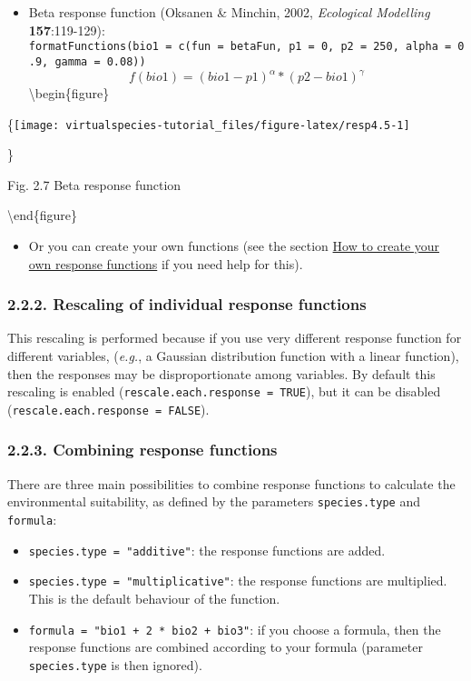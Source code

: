 \documentclass[]{article}
\providecommand{\tightlist}{%
  \setlength{\itemsep}{0pt}\setlength{\parskip}{0pt}}
\begin{document}
\begin{itemize}
\tightlist
\item
  Beta response function (Oksanen \& Minchin, 2002, \emph{Ecological
  Modelling} \textbf{157}:119-129):
  \texttt{formatFunctions(bio1\ =\ c(fun\ =\ \textquotesingle{}betaFun\textquotesingle{},\ p1\ =\ 0,\ p2\ =\ 250,\ alpha\ =\ 0.9,\ gamma\ =\ 0.08))}
  \[ f(bio1) = (bio1 - p1)^{\alpha} * (p2 - bio1)^{\gamma} \]
  \textbackslash{}begin\{figure\}
\end{itemize}

\{\centering \texttt{[image: virtualspecies-tutorial\_files/figure-latex/resp4.5-1]}

\}

\caption{Fig. 2.7 Beta response function}\label{fig:resp4.5}

\textbackslash{}end\{figure\}

\begin{itemize}
\tightlist
\item
  Or you can create your own functions (see the section
  \protect\hyperlink{how-to-create-and-use-your-own-response-functions}{How
  to create your own response functions} if you need help for this).
\end{itemize}

\subsubsection{2.2.2. Rescaling of individual response
functions}\label{rescaling-of-individual-response-functions}

This rescaling is performed because if you use very different response
function for different variables, (\emph{e.g.}, a Gaussian distribution
function with a linear function), then the responses may be
disproportionate among variables. By default this rescaling is enabled
(\texttt{rescale.each.response\ =\ TRUE}), but it can be disabled
(\texttt{rescale.each.response\ =\ FALSE}).

\subsubsection{2.2.3. Combining response
functions}\label{combining-response-functions}

There are three main possibilities to combine response functions to
calculate the environmental suitability, as defined by the parameters
\texttt{species.type} and \texttt{formula}:

\begin{itemize}
\tightlist
\item
  \texttt{species.type\ =\ "additive"}: the response functions are
  added.
\item
  \texttt{species.type\ =\ "multiplicative"}: the response functions are
  multiplied. This is the default behaviour of the function.
\item
  \texttt{formula\ =\ "bio1\ +\ 2\ *\ bio2\ +\ bio3"}: if you choose a
  formula, then the response functions are combined according to your
  formula (parameter \texttt{species.type} is then ignored).
\end{itemize}
\end{document}
